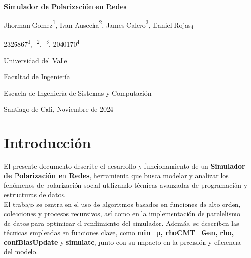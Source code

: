 \documentclass{article}
\begin{document}
  \begin{titlepage}
    \centering
    \vspace*{2cm}
    
    \Huge
    \textbf{Simulador de Polarización en Redes}
    
    \vspace{1.5cm}
    
    \Large
    Jhorman Gomez{\textsuperscript{1}}, Ivan Ausecha{\textsuperscript{2}}, James Calero{\textsuperscript{3}}, Daniel Rojas{\textsubscript{4}}
    
    \vspace{0.5cm}
    
    \large
    2326867{\textsuperscript{1}}, -{\textsuperscript{2}}, -{\textsuperscript{3}}, 2040170{\textsuperscript{4}}
    
    \vspace{0.5cm}
    
    \Large
    Universidad del Valle
    
    \vspace{0.5cm}
    
    \large
    Facultad de Ingeniería
    
    \vspace{0.5cm}
    
    \large
    Escuela de Ingeniería de Sistemas y Computación
    
    \vspace{0.5cm}
    
    \large
    Santiago de Cali, Noviembre de 2024
    
  \end{titlepage}
\section{Introducción}
El presente documento describe el desarrollo y funcionamiento de un \textbf{Simulador de Polarización en Redes}, herramienta que busca modelar y analizar los fenómenos de polarización social utilizando técnicas avanzadas de programación y estructuras de datos. 
\\

El trabajo se centra en el uso de algoritmos basados en funciones de alto orden, colecciones y procesos recursivos, así como en la implementación de paralelismo de datos para optimizar el rendimiento del simulador. Además, se describen las técnicas empleadas en funciones clave, como \textbf{min\_p, rhoCMT\_Gen, rho, confBiasUpdate} y \textbf{simulate}, junto con su impacto en la precisión y eficiencia del modelo.
\\
\end{document}
